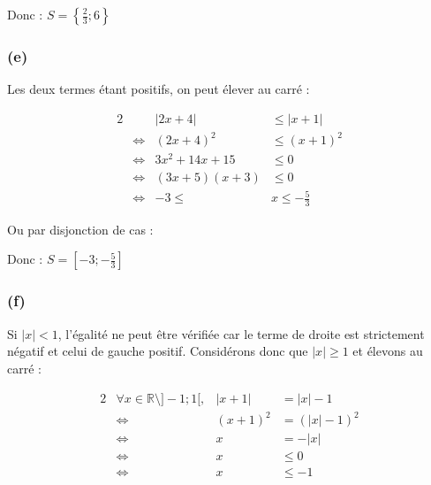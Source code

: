 \documentclass[a4paper,10pt]{report}
\begin{document}
Donc : $S=\left\lbrace \frac{2}{3} ; 6 \right\rbrace$

\subsubsection*{(e)}

Les deux termes étant positifs, on peut élever au carré :

\begin{alignat*}{2}
	&                    & |2x+4|        &\leq |x+1| \\
	&\Longleftrightarrow & (2x+4)^2      &\leq (x+1)^2 \\
	&\Longleftrightarrow & 3x^2 +14x +15 &\leq 0 \\
	&\Longleftrightarrow & (3x+5)(x+3)   &\leq 0 \\
	&\Longleftrightarrow & -3 \leq &x \leq -\frac{5}{3}
\end{alignat*}

Ou par disjonction de cas :


Donc : $S=\left[ -3 ; -\frac{5}{3} \right] $

\subsubsection*{(f)}

Si $|x|<1$, l'égalité ne peut être vérifiée car le terme de droite est strictement négatif et celui de
gauche positif. Considérons donc que $|x|\geq 1$ et élevons au carré :

\begin{alignat*}{2}
	&\forall x \in \mathbb{R} \setminus ]-1;1[,  & |x+1|   &= |x| -1 \\
	&\Longleftrightarrow                         & (x+1)^2 &= (|x|-1)^2 \\
	&\Longleftrightarrow                         & x       &= -|x| \\
	&\Longleftrightarrow                         & x       &\leq 0 \\
		&\Longleftrightarrow                     & x       &\leq -1 \\
\end{alignat*}
\end{document}
